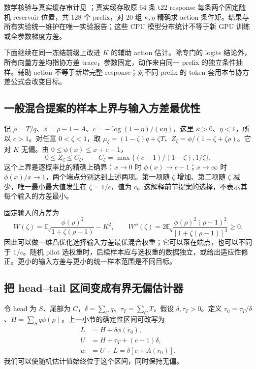\documentclass[lang=cn,scheme=chinese,openany]{../book/elegantbook}
\newcommand{\E}{\mathbb E}
\begin{document}
数学核验与真实缓存审计见 ；真实缓存取原 64 条 t22 response 每条两个固定随机 reservoir 位置，共 128 个 prefix，对 20 组 $\kappa,\eta$ 精确求 action 条件矩。结果与所有实验统一维护在唯一实验报告；这些 CPU 模型分布统计不等于新 GPU 训练或全参数梯度方差。



下面继续在同一冻结前缀上改进 $K$ 的辅助 action 估计。除专门的 logits 结论外，所有向量方差均指协方差 trace，参数固定，动作来自同一 prefix 的独立条件抽样。辅助 action 不等于新增完整 response；对不同 prefix 的 token 套用本节协方差公式会改变目标。

\subsection{一般混合提案的样本上界与输入方差最优性}

记 $\rho=T/q$、$\phi=\rho-1-A$、$c=-\log(1-\eta)/(\kappa\eta)$，这里 $\kappa>0$、$\eta<1$，所以 $c>1$。对任意 $0<\zeta<1$，取 $\mu_\zeta=(1-\zeta)q+\zeta T$、$Z_\zeta=\phi/(1-\zeta+\zeta\rho)$。它对 $K$ 无偏。由 $0\le\phi(x)\le x+c-1$，
\begin{equation}
 0\le Z_\zeta\le C_\zeta,
 \qquad C_\zeta=\max\{(c-1)/(1-\zeta),1/\zeta\}.
\end{equation}
这个上界是逐概率比的精确上确界：$x\to0$ 时 $\phi(x)\to c-1$；$x\to\infty$ 时 $\phi(x)/x\to1$，两个端点分别达到上述两项。第一项随 $\zeta$ 增加、第二项随 $\zeta$ 减少，唯一最小最大值发生在 $\zeta=1/c$，值为 $c$。这解释前节提案的选择，不表示其每个输入的方差最小。

固定输入的方差为
\begin{equation}
 W(\zeta)=\E_q\frac{\phi(\rho)^2}{1+\zeta(\rho-1)}-K^2,
 \qquad W''(\zeta)=2\E_q\frac{\phi(\rho)^2(\rho-1)^2}{[1+\zeta(\rho-1)]^3}\ge0.
\end{equation}
因此可以做一维凸优化选择输入方差最优混合权重；它可以落在端点，也可以不同于 $1/c$。随机 pilot 选权重时，后续样本应与选权重的数据独立，或给出适应性修正。更小的输入方差与更小的统一样本范围是不同目标。
\subsection{把 head--tail 区间变成有界无偏估计器}

令 head 为 $S$、尾部为 $C$，$\delta=\sum_Cq$、$\tau_T=\sum_CT$，假设 $\delta,\tau_T>0$。定义 $r_0=\tau_T/\delta$、$H=\sum_Sq\phi(\rho)$。上一小节的确定性区间可改写为
\begin{align}
 L&=H+\delta\phi(r_0),\\
 U&=H+\tau_T+(c-1)\delta,\\
 w&=U-L=\delta[c+A(r_0)].
 \label{eq:center-tail-interval-lu}
\end{align}
我们可以使随机估计值始终位于这个区间，同时保持无偏。
\end{document}
